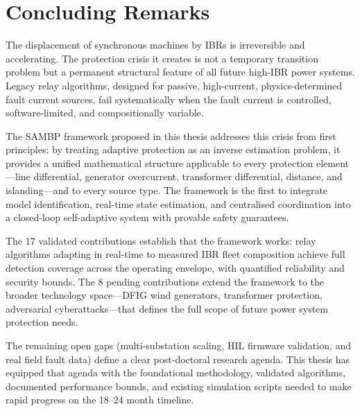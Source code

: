 \section{Concluding Remarks}
\label{sec:ch13_concluding}

The displacement of synchronous machines by IBRs is irreversible and
accelerating. The protection crisis it creates is not a temporary
transition problem but a permanent structural feature of all future
high-IBR power systems. Legacy relay algorithms, designed for passive,
high-current, physics-determined fault current sources, fail systematically
when the fault current is controlled, software-limited, and compositionally
variable.

The SAMBP framework proposed in this thesis addresses this crisis from
first principles: by treating adaptive protection as an inverse estimation
problem, it provides a unified mathematical structure applicable to every
protection element---line differential, generator overcurrent, transformer
differential, distance, and islanding---and to every source type.
The framework is the first to integrate model identification, real-time
state estimation, and centralised coordination into a closed-loop self-adaptive
system with provable safety guarantees.

The 17 validated contributions establish that the framework works: relay
algorithms adapting in real-time to measured IBR fleet composition achieve
full detection coverage across the operating envelope, with quantified
reliability and security bounds. The 8 pending contributions extend the
framework to the broader technology space---DFIG wind generators,
transformer protection, adversarial cyberattacks---that defines the full
scope of future power system protection needs.

The remaining open gaps (multi-substation scaling, HIL firmware validation,
and real field fault data) define a clear post-doctoral research agenda.
This thesis has equipped that agenda with the foundational methodology,
validated algorithms, documented performance bounds, and existing simulation
scripts needed to make rapid progress on the 18--24 month timeline.
